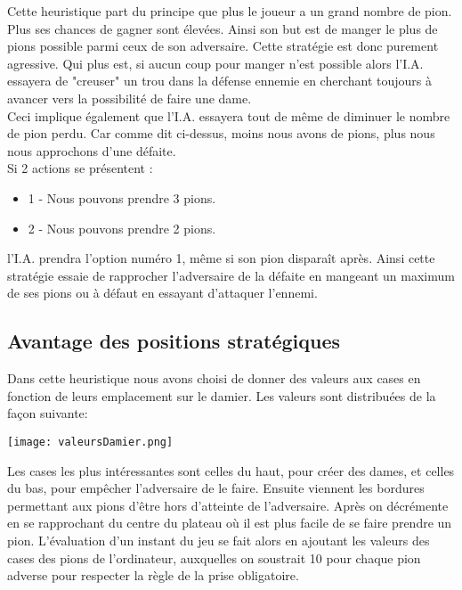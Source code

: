 \documentclass[10pt,a4paper]{report}
\begin{document}
	Cette heuristique part du principe que plus le joueur a un grand nombre de pion. Plus ses chances de gagner sont élevées. Ainsi son but est de manger le plus de pions possible parmi ceux de son adversaire.
	Cette stratégie est donc purement agressive. Qui plus est, si aucun coup pour manger n'est possible alors l'I.A. essayera de "creuser" un trou dans la défense ennemie en cherchant toujours à avancer vers la possibilité de faire une dame. \\
	
	Ceci implique également que l'I.A. essayera tout de même de diminuer le nombre de pion perdu.
	Car comme dit ci-dessus, moins nous avons de pions, plus nous nous approchons d'une défaite. \\
	
	Si 2 actions se présentent : 
	\begin{itemize}
		\item 1 - Nous pouvons prendre 3 pions.
		\item 2 - Nous pouvons prendre 2 pions.
	\end{itemize}
	l'I.A. prendra l'option numéro 1, même si son pion disparaît après.
	Ainsi cette stratégie essaie de rapprocher l'adversaire de la défaite en mangeant un maximum de ses pions ou à défaut en essayant d'attaquer l'ennemi.
	\subsection{Avantage des positions stratégiques}
		Dans cette heuristique nous avons choisi de donner des valeurs aux cases en fonction de leurs emplacement sur le damier. Les valeurs sont distribuées de la façon suivante:
		\begin{center}
			\texttt{[image: valeursDamier.png]}
		\end{center}
		Les cases les plus intéressantes sont celles du haut, pour créer des dames, et celles du bas, pour empêcher l'adversaire de le faire. Ensuite viennent les bordures permettant aux pions d'être hors d'atteinte de l'adversaire. Après on décrémente en se rapprochant du centre du plateau où il est plus facile de se faire prendre un pion.
		L'évaluation d'un instant du jeu se fait alors en ajoutant les valeurs des cases des pions de l'ordinateur, auxquelles on soustrait 10 pour chaque pion adverse pour respecter la règle de la prise obligatoire.
\end{document}
